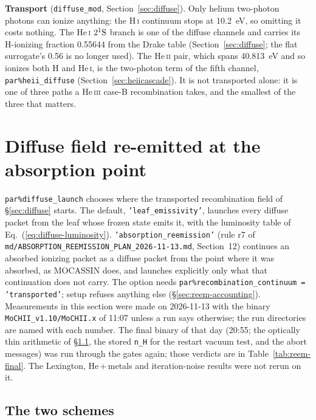 \documentclass[english,a4paper]{my_memo}
\newcommand{\code}[1]{\texttt{#1}}
\begin{document}
\textbf{Transport} (\code{diffuse\_mod}, Section~\ref{sec:diffuse}).  Only
helium two-photon photons can ionize anything: the H\,\textsc{i} continuum
stops at 10.2~eV, so omitting it costs nothing.  The He\,\textsc{i}
$2^1{\rm S}$ branch is one of the diffuse channels and carries its
H-ionizing fraction 0.55644 from the Drake table (Section~\ref{sec:diffuse};
the flat surrogate's 0.56 is no longer used).  The He\,\textsc{ii} pair,
which spans 40.813~eV and so ionizes both H and He\,\textsc{i}, is the
two-photon term of the fifth channel, \code{par\%heii\_diffuse}
(Section~\ref{sec:heiicascade}).  It is not transported alone: it is one of
three paths a He\,\textsc{iii} case-B recombination takes, and the smallest
of the three that matters.

\section{Diffuse field re-emitted at the absorption point}
\label{sec:reemission}
\begin{sloppypar}\noindent
\code{par\%diffuse\_launch} chooses where the transported recombination
field of \S\ref{sec:diffuse} starts.  The default, \code{'leaf\_emissivity'},
launches every diffuse packet from the leaf whose frozen state emits it, with
the luminosity table of Eq.~(\ref{eq:diffuse-luminosity}).
\code{'absorption\_reemission'} (rule r7 of
\code{md/\allowbreak ABSORPTION\_REEMISSION\_\allowbreak PLAN\_2026-11-13.md}, Section~12)
continues an absorbed ionizing packet as a diffuse packet from the point
where it was absorbed, as MOCASSIN does, and launches explicitly only what
that continuation does not carry.  The option needs
\code{par\%recombination\_continuum = 'transported'}; setup refuses anything
else (\S\ref{sec:reem-accounting}).  Measurements in this section were made
on 2026-11-13 with the binary \code{MoCHII\_v1.10/MoCHII.x} of 11:07
unless a run says otherwise; the run directories are named with each number.
The final binary of that day (20:55; the optically thin arithmetic of
\S\ref{sec:reem-rule}, the stored \code{n\_H} for the restart vacuum test, and
the abort messages) was run through the gates again; those verdicts are in
Table~\ref{tab:reem-final}.  The Lexington, He\,+\,metals and iteration-noise
results were not rerun on it.
\end{sloppypar}

\subsection{The two schemes}
\label{sec:reem-rule}
\end{document}
